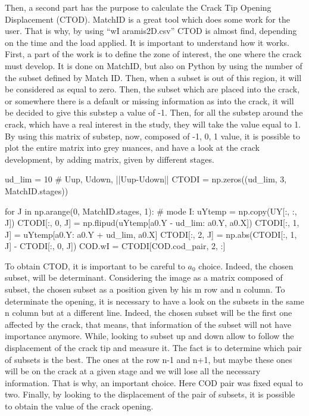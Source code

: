 Then, a second part has the purpose to calculate the Crack Tip Opening Displacement (CTOD). MatchID is a great tool which does some work for the user. That is why, by using “wI aramis2D.csv” CTOD is almost find, depending on the time and the load applied. It is important to understand how it works. First, a part of the work is to define the zone of interest, the one where the crack must develop. It is done on MatchID, but also on Python by using the number of the subset defined by Match ID. Then, when a subset is out of this region, it will be considered as equal to zero. Then, the subset which are placed into the crack, or somewhere there is a default or missing information as into the crack, it will be decided to give this substep a value of -1. Then, for all the substep around the crack, which have a real interest in the study, they will take the value equal to 1. By using this matrix of substep, now, composed of -1, 0, 1 value, it is possible to plot the entire matrix into grey nuances, and have a look at the crack development, by adding matrix, given by different stages.

\begin{customFrame}
ud_lim = 10
# Uup, Udown, ||Uup-Udown||
CTODI  = np.zeros((ud_lim, 3, MatchID.stages))

for J in np.arange(0, MatchID.stages, 1):
# mode I:
uYtemp = np.copy(UY[:, :, J])
CTODI[:, 0, J] = np.flipud(uYtemp[a0.Y - ud_lim: a0.Y, a0.X])
CTODI[:, 1, J] = uYtemp[a0.Y: a0.Y + ud_lim, a0.X]
CTODI[:, 2, J] = np.abs(CTODI[:, 1, J] - CTODI[:, 0, J])
COD.wI = CTODI[COD.cod_pair, 2, :]
\end{customFrame}

To obtain CTOD, it is important to be careful to $a_{0}$ choice. Indeed, the chosen subset, will be determinant. Considering the image as a matrix composed of subset, the chosen subset as a position given by his m row and n column. To determinate the opening, it is necessary to have a look on the subsets in the same n column but at a different line. Indeed, the chosen subset will be the first one affected by the crack, that means, that information of the subset will not have importance anymore. While, looking to subset up and down allow to follow the displacement of the crack tip and measure it. The fact is to determine which pair of subsets is the best. The ones at the row n-1 and n+1, but maybe these ones will be on the crack at a given stage and we will lose all the necessary information. That is why, an important choice. Here COD pair was fixed equal to two.  Finally, by looking to the displacement of the pair of subsets, it is possible to obtain the value of the crack opening.

